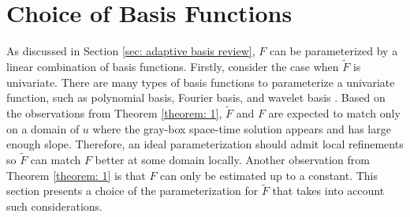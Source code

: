 \section{Choice of Basis Functions}
\label{sec: flux param}
As discussed in Section \ref{sec: adaptive basis review}, 
$F$ can be parameterized by a linear combination of basis functions.
Firstly, consider the case when $\tilde{F}$ is univariate. 
There are many types of basis
functions to parameterize a univariate function, such as polynomial basis, Fourier basis, and
wavelet basis \cite{wavelet mallat}. 
Based on the observations from Theorem \ref{theorem: 1}, $\tilde{F}$ and $F$
are expected to match only on a domain of $u$ 
where the gray-box space-time solution appears and has large enough slope.
Therefore, an ideal parameterization should 
admit local refinements so $\tilde{F}$ can match $F$ better at some domain locally.
Another observation from Theorem \ref{theorem: 1} is that $F$ can only be estimated up to 
a constant.
This section presents a choice of the parameterization for $\tilde{F}$ that takes into account
such considerations.\\


